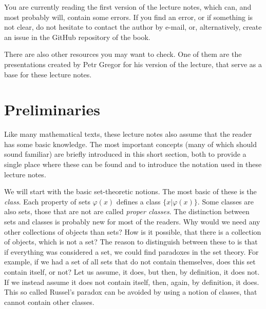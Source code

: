 You are currently reading the first version of the lecture notes, which can, and most probably will, contain some errors. If you find an error, or if something is not clear, do not hesitate to contact the author by e-mail, or, alternatively, create an issue in the GitHub repository of the book. 

There are also other resources you may want to check. One of them are the presentations created by Petr Gregor for his version of the lecture, that serve as a base for these lecture notes.


\section{Preliminaries}

Like many mathematical texts, these lecture notes also assume that the reader has some basic knowledge. The most important concepts (many of which should sound familiar) are briefly introduced in this short section, both to provide a single place where these can be found and to introduce the notation used in these lecture notes.

We will start with the basic set-theoretic notions. The most basic of these is the \emph{class}. Each property of sets $\varphi(x)$ defines a class $\{x|\varphi(x)\}$. Some classes are also sets, those that are not are called \emph{proper classes}. The distinction between sets and classes is probably new for most of the readers. Why would we need any other collections of objects than sets? How is it possible, that there is a collection of objects, which is not a set? The reason to distinguish between these to is that if everything was considered a set, we could find paradoxes in the set theory. For example, if we had a set of all sets that do not contain themselves, does this set contain itself, or not? Let us assume, it does, but then, by definition, it does not. If we instead assume it does not contain itself, then, again, by definition, it does. This so called Russel's paradox can be avoided by using a notion of classes, that cannot contain other classes. 

